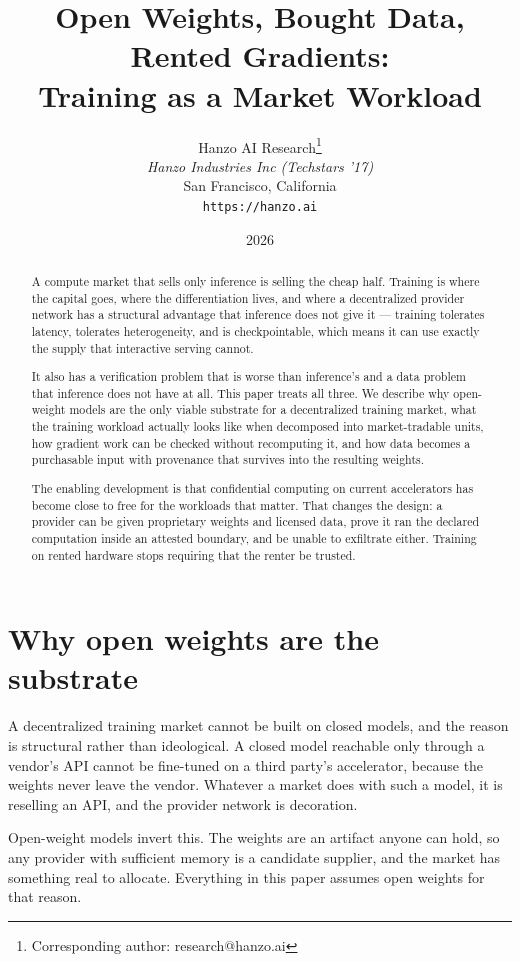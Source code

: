 \documentclass[11pt,a4paper]{article}
\title{Open Weights, Bought Data, Rented Gradients:\\Training as a Market Workload}
\author{
Hanzo AI Research\thanks{Corresponding author: research@hanzo.ai} \\
\textit{Hanzo Industries Inc (Techstars '17)} \\
San Francisco, California \\
\texttt{https://hanzo.ai}
}
\date{2026}
\begin{document}
\hanzocoverpage

\begin{abstract}
A compute market that sells only inference is selling the cheap half. Training
is where the capital goes, where the differentiation lives, and where a
decentralized provider network has a structural advantage that inference does not
give it --- training tolerates latency, tolerates heterogeneity, and is
checkpointable, which means it can use exactly the supply that interactive serving
cannot.

It also has a verification problem that is worse than inference's and a data
problem that inference does not have at all. This paper treats all three. We
describe why open-weight models are the only viable substrate for a decentralized
training market, what the training workload actually looks like when decomposed
into market-tradable units, how gradient work can be checked without recomputing
it, and how data becomes a purchasable input with provenance that survives into
the resulting weights.

The enabling development is that confidential computing on current accelerators
has become close to free for the workloads that matter. That changes the design:
a provider can be given proprietary weights and licensed data, prove it ran the
declared computation inside an attested boundary, and be unable to exfiltrate
either. Training on rented hardware stops requiring that the renter be trusted.
\end{abstract}

\tableofcontents
\newpage

\section{Why open weights are the substrate}

A decentralized training market cannot be built on closed models, and the reason
is structural rather than ideological. A closed model reachable only through a
vendor's API cannot be fine-tuned on a third party's accelerator, because the
weights never leave the vendor. Whatever a market does with such a model, it is
reselling an API, and the provider network is decoration.

Open-weight models invert this. The weights are an artifact anyone can hold, so
any provider with sufficient memory is a candidate supplier, and the market has
something real to allocate. Everything in this paper assumes open weights for
that reason.
\end{document}
